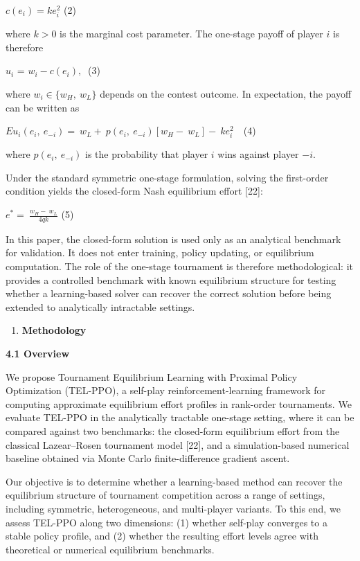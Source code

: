 \documentclass[
]{article}
\begin{document}
\(c\left( e_{i} \right) = ke_{i}^{2}\) (2)

where \(k > 0\) is the marginal cost parameter. The one-stage payoff of
player \(i\) is therefore

\(u_{i}\) = \(w_{i} - c\left( e_{i} \right),\ \) (3)

where \(w_{i} \in \{ w_{H},\ w_{L}\}\) depends on the contest outcome.
In expectation, the payoff can be written as

\(Eu_{i}\left( e_{i},\ e_{- i} \right) = \ w_{L} + \ p\left( e_{i},\ e_{- i} \right)\left\lbrack w_{H} - \ w_{L} \right\rbrack - \ ke_{i}^{2}\ \ \ \)
(4)

where \(p\left( e_{i},\ e_{- i} \right)\) is the probability that player
\(i\) wins against player \(- i\).

Under the standard symmetric one-stage formulation, solving the
first-order condition yields the closed-form Nash equilibrium effort
{[}22{]}:

\(e^{*} = \ \frac{w_{H} - \ w_{L}}{4qk}\) (5)

In this paper, the closed-form solution is used only as an analytical
benchmark for validation. It does not enter training, policy updating,
or equilibrium computation. The role of the one-stage tournament is
therefore methodological: it provides a controlled benchmark with known
equilibrium structure for testing whether a learning-based solver can
recover the correct solution before being extended to analytically
intractable settings.

\begin{enumerate}
\def\labelenumi{\arabic{enumi}.}
\setcounter{enumi}{3}
\item
  \textbf{Methodology}
\end{enumerate}

\textbf{4.1 Overview}

We propose Tournament Equilibrium Learning with Proximal Policy
Optimization (TEL-PPO), a self-play reinforcement-learning framework for
computing approximate equilibrium effort profiles in rank-order
tournaments. We evaluate TEL-PPO in the analytically tractable one-stage
setting, where it can be compared against two benchmarks: the
closed-form equilibrium effort from the classical Lazear--Rosen
tournament model {[}22{]}, and a simulation-based numerical baseline
obtained via Monte Carlo finite-difference gradient ascent.

Our objective is to determine whether a learning-based method can
recover the equilibrium structure of tournament competition across a
range of settings, including symmetric, heterogeneous, and multi-player
variants. To this end, we assess TEL-PPO along two dimensions: (1)
whether self-play converges to a stable policy profile, and (2) whether
the resulting effort levels agree with theoretical or numerical
equilibrium benchmarks.
\end{document}

